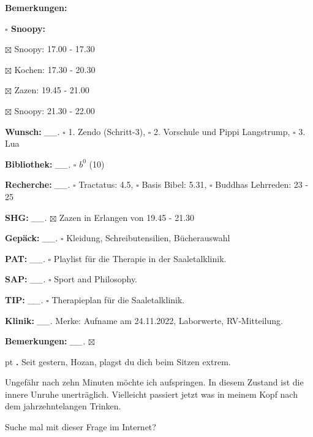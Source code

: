 \documentclass[10pt,a4paper]{article}
\newcounter{notec}
\newcommand\notep[1]{%
  \stepcounter{notec}
  \vskip #1pt
  {\bf\arabic{notec}.}
}
\newcommand\prop[1] {{\color {alizarin} {\bf #1}}}             %
\newcommand\opti[1] {{\color {amethyst} {\bf #1}}}             %
\newcommand\mand[1] {{\color {burntorange} {\bf #1}}}          %
\newcommand\bottomspace{\vskip 4pt}
\newcommand\n[1] { {\sl #1.} \hskip 5pt }
\begin{document}
\begin{mdframed}[style=daystyle]
\begin{labeling}{{\mand {Bemerkungen:}}}
\begin{minipage}{0.75\textwidth}
\begin{labeling}{\prop {$\square$ {Snoopy:}}}
      \item[$\boxtimes$ Snoopy:] 17.00 - 17.30
      \item[$\boxtimes$ Kochen:] 17.30 - 20.30
        
      \item[$\boxtimes$ Zazen:]  19.45 - 21.00
      \item[$\boxtimes$ Snoopy:] 21.30 - 22.00
      \end{labeling}
    \end{minipage}
    \bottomspace
  \item[{\mand {Wunsch:}}]       \n{\_\_} $\square$ 1. Zendo (Schritt-3),
      $\square$ 2. Vorschule und Pippi Langstrump, $\square$ 3. Lua
  \item[{\mand {Bibliothek:}}]   \n{\_\_} $\square$ $b^{0}$ (10)
  \item[{\mand {Recherche:}}]    \n{\_\_} $\square$ Tractatus: 4.5, $\square$ Basis Bibel: 5.31,
      $\square$ Buddhas Lehrreden: 23 - 25
  \item[{\mand {SHG:}}]          \n{\_\_} $\boxtimes$ Zazen in Erlangen von 19.45 - 21.30
  \item[{\mand {Gepäck:}}]       \n{\_\_} $\square$ Kleidung, Schreibutensilien, Bücherauswahl
  \item[{\opti {PAT:}}]          \n{\_\_} $\square$ Playlist für die Therapie in der Saaletalklinik.
  \item[{\opti {SAP:}}]          \n{\_\_} $\square$ Sport and Philosophy.
  \item[{\opti {TIP:}}]          \n{\_\_} $\square$ Therapieplan für die Saaletalklinik.
  \item[{\opti {Klinik:}}]       \n{\_\_} Merke: Aufname am 24.11.2022, Laborwerte, RV-Mitteilung.
  \item[{\mand {Bemerkungen:}}]  \n{\_\_} $\boxtimes$
  \end{labeling}
    
  \setcounter{notec}{0}
  
  \notep 0 Seit gestern, Hozan, plagst du dich beim Sitzen extrem.

  \vskip 2pt
  Ungefähr nach zehn Minuten möchte ich aufspringen. In diesem Zustand ist die
  innere Unruhe unerträglich. Vielleicht passiert jetzt was in meinem Kopf nach
  dem jahrzehntelangen Trinken.

  \vskip 2pt
  Suche mal mit dieser Frage im Internet?


\end{mdframed}
\end{document}
